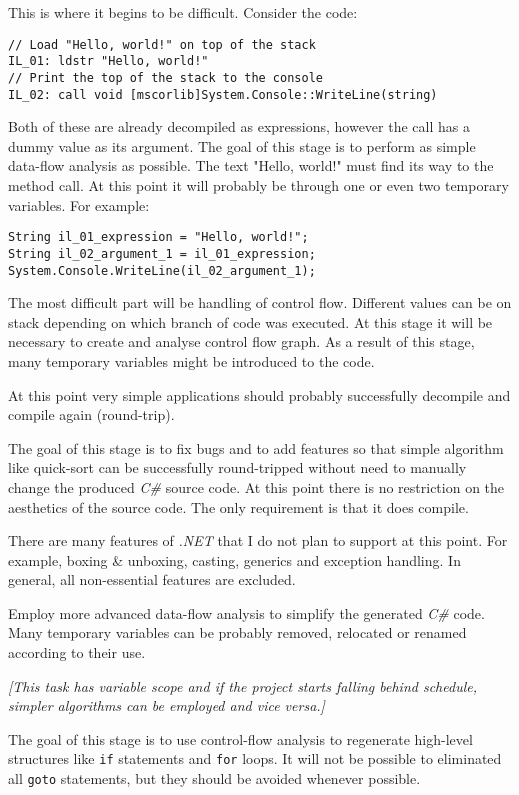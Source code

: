 \documentclass[12pt]{article}
\begin{document}
\begin{enumerate}
This is where it begins to be difficult.  Consider the code:
\begin{verbatim}
// Load "Hello, world!" on top of the stack
IL_01: ldstr "Hello, world!"
// Print the top of the stack to the console
IL_02: call void [mscorlib]System.Console::WriteLine(string)
\end{verbatim}
Both of these are already decompiled as expressions, however the call 
has a dummy value as its argument.  The goal of this stage is to perform 
as simple data-flow analysis as possible.  The text "Hello, world!" must 
find its way to the method call.  At this point it will probably be through 
one or even two temporary variables.  For example:
\begin{verbatim}
String il_01_expression = "Hello, world!";
String il_02_argument_1 = il_01_expression;
System.Console.WriteLine(il_02_argument_1);
\end{verbatim}
The most difficult part will be handling of control flow.  Different values 
can be on stack depending on which branch of code was executed.  At this 
stage it will be necessary to create and analyse control flow graph.  As a 
result of this stage, many temporary variables might be introduced to the 
code.

At this point very simple applications should probably successfully 
decompile and compile again (round-trip).

The goal of this stage is to fix bugs and to add features so that simple 
algorithm like quick-sort can be successfully round-tripped without need to 
manually change the produced \emph{C\#} source code.  At this point there is 
no restriction on the aesthetics of the source code.  The only requirement 
is that it does compile. 

There are many features of \emph{.NET} that I do not plan to support at 
this point.  For example, boxing \& unboxing, casting, generics and 
exception handling.  In general, all non-essential features are excluded.

Employ more advanced data-flow analysis to simplify the generated \emph{C\#} 
code.  Many temporary variables can be probably removed, relocated or 
renamed according to their use.

\emph{[This task has variable scope and if the project starts falling behind 
schedule, simpler algorithms can be employed and vice versa.]}

The goal of this stage is to use control-flow analysis to regenerate 
high-level structures like \verb|if| statements and \verb|for| loops. 
It will not be possible to eliminated all \verb|goto| statements, but they 
should be avoided whenever possible.


\end{enumerate}
\end{document}
